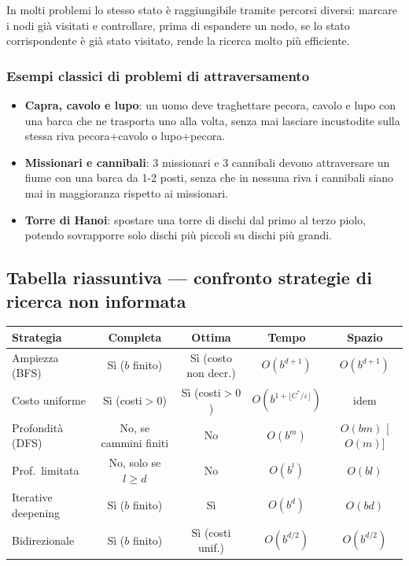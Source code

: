 \documentclass[11pt,a4paper]{report}
\begin{document}
In molti problemi lo stesso stato è raggiungibile tramite percorsi diversi: marcare i nodi già visitati e controllare, prima di espandere un nodo, se lo stato corrispondente è già stato visitato, rende la ricerca molto più efficiente.

\subsubsection*{Esempi classici di problemi di attraversamento}

\begin{itemize}
  \item \textbf{Capra, cavolo e lupo}: un uomo deve traghettare pecora, cavolo e lupo con una barca che ne trasporta uno alla volta, senza mai lasciare incustodite sulla stessa riva pecora+cavolo o lupo+pecora.
  \item \textbf{Missionari e cannibali}: 3 missionari e 3 cannibali devono attraversare un fiume con una barca da 1-2 posti, senza che in nessuna riva i cannibali siano mai in maggioranza rispetto ai missionari.
  \item \textbf{Torre di Hanoi}: spostare una torre di dischi dal primo al terzo piolo, potendo sovrapporre solo dischi più piccoli su dischi più grandi.
\end{itemize}

\subsection{Tabella riassuntiva --- confronto strategie di ricerca non informata}

\begin{center}
\small
\begin{tabular}{@{}lcccc@{}}
\toprule
\textbf{Strategia} & \textbf{Completa} & \textbf{Ottima} & \textbf{Tempo} & \textbf{Spazio} \\
\midrule
Ampiezza (BFS) & Sì ($b$ finito) & Sì (costo non decr.) & $O(b^{d+1})$ & $O(b^{d+1})$ \\
Costo uniforme & Sì (costi$>0$) & Sì (costi$>0$) & $O(b^{1+\lfloor C^*/\varepsilon\rfloor})$ & idem \\
Profondità (DFS) & No, se cammini finiti & No & $O(b^m)$ & $O(bm)$ [$O(m)$] \\
Prof.\ limitata & No, solo se $l\ge d$ & No & $O(b^l)$ & $O(bl)$ \\
Iterative deepening & Sì ($b$ finito) & Sì & $O(b^d)$ & $O(bd)$ \\
Bidirezionale & Sì ($b$ finito) & Sì (costi unif.) & $O(b^{d/2})$ & $O(b^{d/2})$ \\
\bottomrule
\end{tabular}
\normalsize
\end{center}
\end{document}
